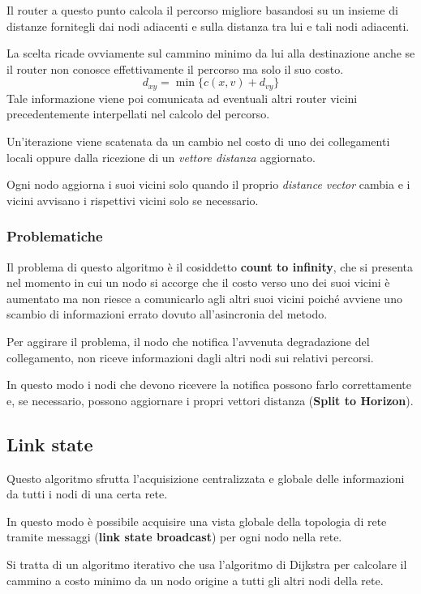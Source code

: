 Il router a questo punto calcola il percorso migliore basandosi su un 
insieme di distanze fornitegli dai nodi adiacenti e sulla distanza tra
lui e tali nodi adiacenti.

La scelta ricade ovviamente sul cammino minimo da lui alla destinazione
anche se il router non conosce effettivamente il percorso ma solo il 
suo costo.
\[ d_{xy} = \min \{ c(x, v) + d_{vy} \} \]
Tale informazione viene poi comunicata ad eventuali altri router vicini
precedentemente interpellati nel calcolo del percorso.

Un'iterazione viene scatenata da un cambio nel costo di uno dei 
collegamenti locali oppure dalla ricezione di un \emph{vettore distanza}
aggiornato.

Ogni nodo aggiorna i suoi vicini solo quando il proprio \emph{distance
vector} cambia e i vicini avvisano i rispettivi vicini solo se 
necessario.

\subsubsection{Problematiche}
Il problema di questo algoritmo è il cosiddetto \textbf{count to
infinity}, che si presenta nel momento in cui un nodo si accorge che
il costo verso uno dei suoi vicini è aumentato ma non riesce a
comunicarlo agli altri suoi vicini poiché avviene uno scambio di
informazioni errato dovuto all'asincronia del metodo.

Per aggirare il problema, il nodo che notifica l'avvenuta degradazione
del collegamento, non riceve informazioni dagli altri nodi sui relativi
percorsi.

In questo modo i nodi che devono ricevere la notifica possono farlo 
correttamente e, se necessario, possono aggiornare i propri vettori 
distanza (\textbf{Split to Horizon}).

\subsection{Link state}
Questo algoritmo sfrutta l'acquisizione centralizzata e globale delle 
informazioni da tutti i nodi di una certa rete.

In questo modo è possibile acquisire una vista globale della topologia
di rete tramite messaggi (\textbf{link state broadcast}) per ogni nodo
nella rete.

Si tratta di un algoritmo iterativo che usa l'algoritmo di Dijkstra
per calcolare il cammino a costo minimo da un nodo origine a tutti gli
altri nodi della rete.


